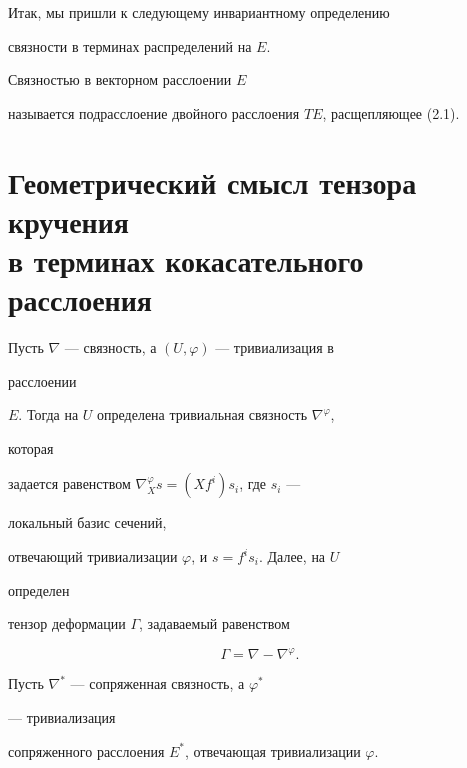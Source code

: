  


Итак, мы пришли к следующему инвариантному определению 


связности в терминах распределений на $E$.


 


\begin{defnnonum} Связностью в векторном расслоении $E$ 


называется подрасслоение двойного расслоения $TE$, расщепляющее (2.1). 


\end{defnnonum} 


 


\section{Геометрический смысл тензора кручения\protect\\ 


в терминах кокасательного расслоения} 


 


Пусть $\nabla$ --- связность, а $(U,\varphi)$ --- тривиализация в 


расслоении 


$E$. Тогда на $U$ определена тривиальная связность $\nabla^\varphi$, 


которая  


задается равенством $\nabla^\varphi_X s=(Xf^i)s_i$, где $s_i$ --- 


локальный базис сечений,  


отвечающий тривиализации $\varphi$, и $s=f^i s_i$. Далее, на $U$ 


определен  


тензор деформации $\Gamma$, задаваемый равенством 


\begin{equation} 


\Gamma=\nabla-\nabla^\varphi. 


\end{equation} 


 


Пусть $\nabla^*$ --- сопряженная связность, а $\varphi^*$ 


--- тривиализация  


сопряженного расслоения $E^*$, отвечающая тривиализации $\varphi$. 



